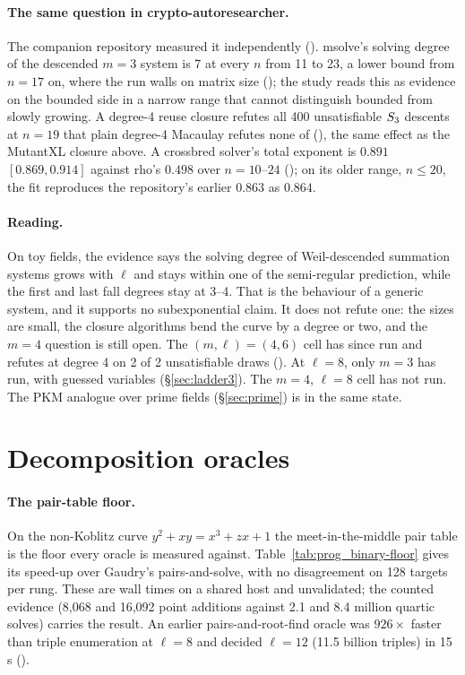 \paragraph{The same question in crypto-autoresearcher.} The companion
repository measured it independently (\cite{icprogram2026}). msolve's
solving degree of the descended $m=3$ system is 7 at every $n$ from 11 to 23,
a lower bound from $n=17$ on, where the run walls on matrix size
(); the study reads this as
evidence on the bounded side in a narrow range that cannot distinguish
bounded from slowly growing. A degree-4 reuse closure refutes all 400
unsatisfiable $S_{3}$ descents at $n=19$ that plain degree-4 Macaulay
refutes none of (), the same effect
as the MutantXL closure above. A crossbred solver's total exponent is $0.891$
$[0.869,0.914]$ against rho's $0.498$ over $n=10$--$24$
(); on its older range,
$n\le20$, the fit reproduces the repository's earlier $0.863$ as $0.864$.

\paragraph{Reading.} On toy fields, the evidence says the solving degree of
Weil-descended summation systems grows with $\ell$ and stays within one of
the semi-regular prediction, while the first and last fall degrees stay
at 3--4. That is the behaviour of a generic system, and it supports no
subexponential claim. It does not refute one: the sizes are small, the
closure algorithms bend the curve by a degree or two, and the $m=4$
question is still open. The $(m,\ell)=(4,6)$ cell has since run and refutes
at degree 4 on 2 of 2 unsatisfiable draws
(). At $\ell=8$, only $m=3$ has
run, with guessed variables (\S\ref{sec:ladder3}). The $m=4$, $\ell=8$
cell has not run. The PKM
analogue over prime fields (\S\ref{sec:prime}) is in the same state.

\section{Decomposition oracles}

\paragraph{The pair-table floor.} On the non-Koblitz curve
$y^2+xy=x^3+zx+1$ the meet-in-the-middle pair table is the floor every
oracle is measured against. Table~\ref{tab:prog_binary-floor} gives its
speed-up over Gaudry's pairs-and-solve, with no disagreement on 128
targets per rung. These are wall times on a shared host and
unvalidated; the counted evidence (8{,}068 and 16{,}092 point additions
against 2.1 and 8.4 million quartic solves) carries the result. An earlier
pairs-and-root-find oracle was $926\times$ faster than triple enumeration at
$\ell=8$ and decided $\ell=12$ (11.5 billion triples) in 15\,s
().


